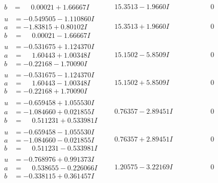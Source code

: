 \documentclass[1p]{elsarticle_modified}
\theoremstyle{definition}
\begin{document}
$$\begin{array}{c|c|c}
\begin{aligned}
b &= \phantom{-}0.00021 + 1.66667 I\end{aligned}
 & \phantom{-}15.3513 - 1.9660 I & \phantom{-0.000000 } 0 \\ \hline\begin{aligned}
u &= -0.549505 - 1.110860 I \\
a &= -1.83815 + 0.80102 I \\
b &= \phantom{-}0.00021 - 1.66667 I\end{aligned}
 & \phantom{-}15.3513 + 1.9660 I & \phantom{-0.000000 } 0 \\ \hline\begin{aligned}
u &= -0.531675 + 1.124370 I \\
a &= \phantom{-}1.60443 + 1.00348 I \\
b &= -0.22168 - 1.70090 I\end{aligned}
 & \phantom{-}15.1502 - 5.8509 I & \phantom{-0.000000 } 0 \\ \hline\begin{aligned}
u &= -0.531675 - 1.124370 I \\
a &= \phantom{-}1.60443 - 1.00348 I \\
b &= -0.22168 + 1.70090 I\end{aligned}
 & \phantom{-}15.1502 + 5.8509 I & \phantom{-0.000000 } 0 \\ \hline\begin{aligned}
u &= -0.659458 + 1.055530 I \\
a &= -1.084660 + 0.021855 I \\
b &= \phantom{-}0.511231 + 0.533981 I\end{aligned}
 & \phantom{-}0.76357 - 2.89451 I & \phantom{-0.000000 } 0 \\ \hline\begin{aligned}
u &= -0.659458 - 1.055530 I \\
a &= -1.084660 - 0.021855 I \\
b &= \phantom{-}0.511231 - 0.533981 I\end{aligned}
 & \phantom{-}0.76357 + 2.89451 I & \phantom{-0.000000 } 0 \\ \hline\begin{aligned}
u &= -0.768976 + 0.991373 I \\
a &= \phantom{-}0.538655 - 0.226066 I \\
b &= -0.338115 + 0.361457 I\end{aligned}
 & \phantom{-}1.20575 - 3.22169 I & \phantom{-0.000000 } 0 \\ \hline\begin{aligned}

\end{aligned}
\end{array}$$
\end{document}
